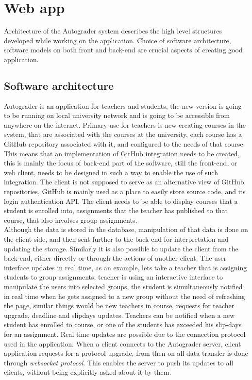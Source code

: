 \section{Web app}
Architecture of the Autograder system describes the high level structures developed while working on the application. Choice of software architecture, software models on both front and back-end are crucial aspects of creating good application.
\subsection{Software architecture}
Autograder is an application for teachers and students, the new version is going to be running on local university network and is going to be accessible from anywhere on the internet. Primary use for teachers is new creating courses in the system, that are associated with the courses at the university, each course has a GitHub repository associated with it, and configured to the needs of that course. This means that an implementation of GitHub integration needs to be created, this is mainly the focus of back-end part of the software, still the front-end, or web client, needs to be designed in such a way to enable the use of such integration. The client is not supposed to serve as an alternative view of GitHub repositories, GitHub is mainly used as a place to easily store source code, and its login authentication API. The client needs to be able to display courses that a student is enrolled into, assignments that the teacher has published to that course, that also involves group assignments.
\\Although the data is stored in the database, manipulation of that data is done on the client side, and then sent further to the back-end for interpretation and updating the storage. Similarly it is also possible to update the client from the back-end, either directly or through the actions of another client. The user interface updates in real time, as an example, lets take a teacher that is assigning students to group assignments, teacher is using an interactive interface to manipulate the users into selected groups, the student is simultaneously notified in real time when he gets assigned to a new group without the need of refreshing the page, similar things would be new teachers in course, requests for teacher upgrade, deadline and slipdays updates. Teachers can be notified when a new student has enrolled to course, or one of the students has exceeded his slip-days for an assignment. Real time updates are possible due to the connection protocol used in the application. When a client connects to the Autograder server, client application requests for a protocol upgrade, from then on all data transfer is done through \emph{websocket protocol}\cite{websocket}. This enables the server to push its updates to all clients, without being explicitly asked about it by them.
